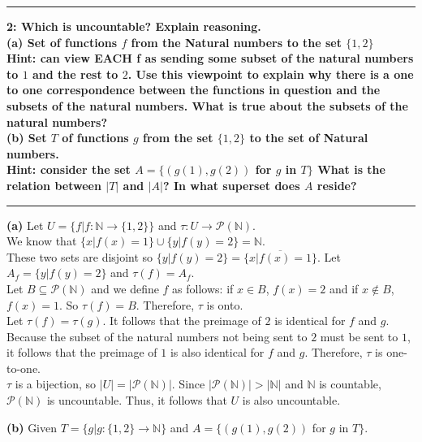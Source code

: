 \documentclass[11pt]{article}
\newcommand\question[2]{\vspace{.25in}\hrule\textbf{#1: #2}\vspace{.5em}\hrule\vspace{.10in}}
\renewcommand\part[1]{\vspace{.10in}\textbf{(#1)}}
\begin{document}
\question{2}{Which is uncountable? Explain reasoning.\\[\baselineskip](a) Set of functions $f$ from the Natural numbers to the set $\{1, 2\}$\\ Hint: can view EACH f as sending some subset of the natural numbers to $1$ and the rest to $2$. Use this viewpoint to explain why there is a one to one correspondence between the functions in question and the subsets of the natural numbers. What is true about the subsets of the natural numbers?\\[\baselineskip](b) Set $T$ of functions $g$ from the set $\{1, 2\}$ to the set of Natural numbers.\\Hint: consider the set $A = \{ (g(1),g(2))$ for $g$ in $T \}$ What is the relation between $|T|$ and $|A|$?  In what superset does $A$ reside?} 

\part{a} Let $U = \{f | f: \mathbb{N} \rightarrow \{1, 2\}\}$ and $\tau: U \rightarrow \mathcal{P}(\mathbb{N})$.\\[\baselineskip]

We know that $\{x | f(x) = 1\} \cup \{y | f(y) = 2\} = \mathbb{N}$.\\[\baselineskip]

These two sets are disjoint so $\{y | f(y) = 2\} = \overline{\{x | f(x) = 1\}}$. Let $A_f = \{y | f(y) = 2\}$ and $\tau(f) = A_f$. \\[\baselineskip]Let $B \subseteq \mathcal{P}(\mathbb{N})$ and we define $f$ as follows: if $x \in B$, $f(x) = 2$ and if $x \notin B$, $f(x) = 1$. So $\tau(f) = B$. Therefore, $\tau$ is onto.\\[\baselineskip] Let $\tau(f) = \tau(g)$. It follows that the preimage of $2$ is identical for $f$ and $g$. Because the subset of the natural numbers not being sent to $2$ must be sent to $1$, it follows that the preimage of $1$ is also identical for $f$ and $g$. Therefore, $\tau$ is one-to-one.\\[\baselineskip] $\tau$ is a bijection, so $|U| = |\mathcal{P}(\mathbb{N})|$. Since $|\mathcal{P}(\mathbb{N})| > |\mathbb{N}|$ and $\mathbb{N}$ is countable, $\mathcal{P}(\mathbb{N})$ is uncountable. Thus, it follows that $U$ is also uncountable.

\part{b} Given $T = \{g | g: \{1, 2\} \rightarrow \mathbb{N}\}$ and $A = \{(g(1), g(2))$ for $g$ in $T\}$.\\[\baselineskip] 
\end{document}
